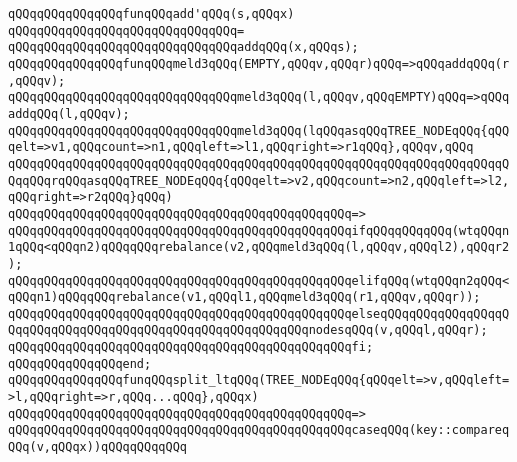 \newline
\newline
\verb|qQQqqQQqqQQqqQQqfunqQQqadd'qQQq(s,qQQqx)|\newline
\verb|qQQqqQQqqQQqqQQqqQQqqQQqqQQqqQQq=|\newline
\verb|qQQqqQQqqQQqqQQqqQQqqQQqqQQqqQQqaddqQQq(x,qQQqs);|\newline
\newline
\newline
\verb|qQQqqQQqqQQqqQQqfunqQQqmeld3qQQq(EMPTY,qQQqv,qQQqr)qQQq=>qQQqaddqQQq(r,qQQqv);|\newline
\verb|qQQqqQQqqQQqqQQqqQQqqQQqqQQqqQQqmeld3qQQq(l,qQQqv,qQQqEMPTY)qQQq=>qQQqaddqQQq(l,qQQqv);|\newline
\newline
\verb|qQQqqQQqqQQqqQQqqQQqqQQqqQQqqQQqmeld3qQQq(lqQQqasqQQqTREE_NODEqQQq{qQQqelt=>v1,qQQqcount=>n1,qQQqleft=>l1,qQQqright=>r1qQQq},qQQqv,qQQq|\newline
\verb|qQQqqQQqqQQqqQQqqQQqqQQqqQQqqQQqqQQqqQQqqQQqqQQqqQQqqQQqqQQqqQQqqQQqqQQqqQQqrqQQqasqQQqTREE_NODEqQQq{qQQqelt=>v2,qQQqcount=>n2,qQQqleft=>l2,qQQqright=>r2qQQq}qQQq)|\newline
\verb|qQQqqQQqqQQqqQQqqQQqqQQqqQQqqQQqqQQqqQQqqQQqqQQq=>|\newline
\verb|qQQqqQQqqQQqqQQqqQQqqQQqqQQqqQQqqQQqqQQqqQQqqQQqifqQQqqQQqqQQq(wtqQQqn1qQQq<qQQqn2)qQQqqQQqrebalance(v2,qQQqmeld3qQQq(l,qQQqv,qQQql2),qQQqr2);|\newline
\verb|qQQqqQQqqQQqqQQqqQQqqQQqqQQqqQQqqQQqqQQqqQQqqQQqelifqQQq(wtqQQqn2qQQq<qQQqn1)qQQqqQQqrebalance(v1,qQQql1,qQQqmeld3qQQq(r1,qQQqv,qQQqr));|\newline
\verb|qQQqqQQqqQQqqQQqqQQqqQQqqQQqqQQqqQQqqQQqqQQqqQQqelseqQQqqQQqqQQqqQQqqQQqqQQqqQQqqQQqqQQqqQQqqQQqqQQqqQQqqQQqqQQqnodesqQQq(v,qQQql,qQQqr);|\newline
\verb|qQQqqQQqqQQqqQQqqQQqqQQqqQQqqQQqqQQqqQQqqQQqqQQqfi;|\newline
\verb|qQQqqQQqqQQqqQQqend;|\newline
\newline
\newline
\verb|qQQqqQQqqQQqqQQqfunqQQqsplit_ltqQQq(TREE_NODEqQQq{qQQqelt=>v,qQQqleft=>l,qQQqright=>r,qQQq...qQQq},qQQqx)|\newline
\verb|qQQqqQQqqQQqqQQqqQQqqQQqqQQqqQQqqQQqqQQqqQQqqQQq=>|\newline
\verb|qQQqqQQqqQQqqQQqqQQqqQQqqQQqqQQqqQQqqQQqqQQqqQQqcaseqQQq(key::compareqQQq(v,qQQqx))qQQqqQQqqQQq|\newline
